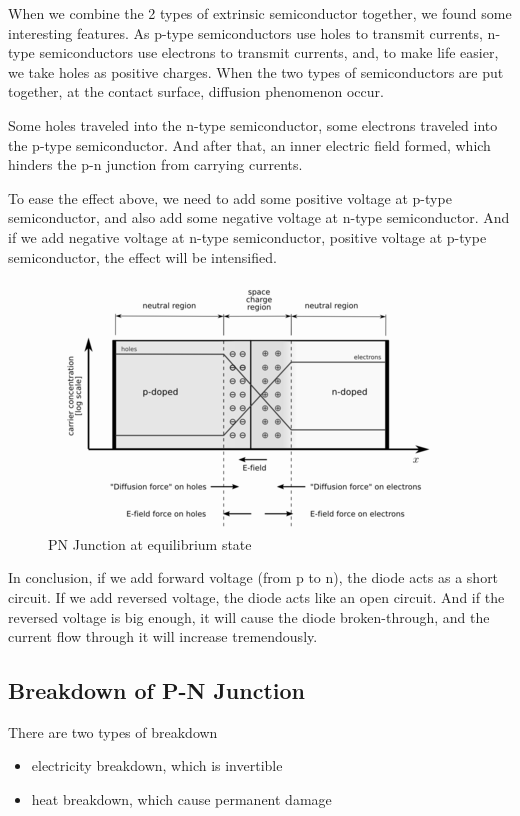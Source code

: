 When we combine the 2 types of extrinsic semiconductor together, we found some interesting features. As p-type semiconductors use holes to transmit currents, n-type semiconductors use electrons to transmit currents, and, to make life easier, we take holes as positive charges. When the two types of semiconductors are put together, at the contact surface, diffusion phenomenon occur.

Some holes traveled into the n-type semiconductor, some electrons traveled into the p-type semiconductor. And after that, an inner electric field formed, which hinders the p-n junction from carrying currents.

To ease the effect above, we need to add some positive voltage at p-type semiconductor, and also add some negative voltage at n-type semiconductor. And if we add negative voltage at n-type semiconductor, positive voltage at p-type semiconductor, the effect will be intensified.

\begin{figure}[H]
  \centering
  \includegraphics[width=0.5\linewidth]{figures/Pn-junction-equilibrium.png}
  \caption{PN Junction at equilibrium state}
  \label{fig:}
\end{figure}

In conclusion, if we add forward voltage (from p to n), the diode acts as a short circuit. If we add reversed voltage, the diode acts like an open circuit. And if the reversed voltage is big enough, it will cause the diode broken-through, and the current flow through it will increase tremendously.

\subsection{Breakdown of P-N Junction}

There are two types of breakdown

\begin{itemize}
\item electricity breakdown, which is invertible
\item heat breakdown, which cause permanent damage
\end{itemize}

